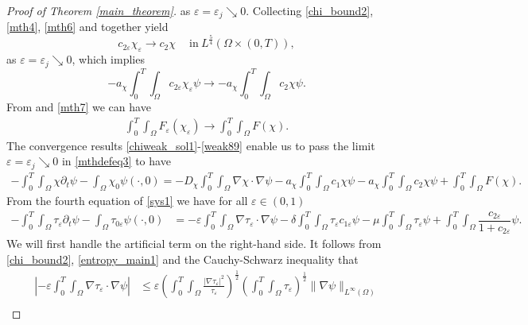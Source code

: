 \documentclass[a4paper,10pt]{article}
\theoremstyle{definition}
\begin{document}
\begin{proof}[Proof of Theorem \ref{main_theorem}]
as $\varepsilon = \varepsilon_j \searrow 0$. Collecting \eqref{chi_bound2}, \eqref{mth4}, \eqref{mth6} and \cite[Lemma 3.9]{tao2021global} together yield
\begin{equation*}
  c_{2\varepsilon}\chi_\varepsilon  \to c_{2}\chi \quad ~\text{in}~ L^{\frac{5}{4}}(\Omega \times (0, T)),
\end{equation*}
as $\varepsilon = \varepsilon_j \searrow 0$, which implies
\begin{equation}
\label{chi_weak2}
  - a_\chi \int_0^T \int_\Omega c_{2\varepsilon}\chi_\varepsilon \psi \to - a_\chi \int_0^T \int_\Omega c_{2}\chi \psi.
\end{equation}
From \cite[Theorem 7, Appendix C: Calculus, particularly C5]{evans2022partial} and \eqref{mth7} we can have
\begin{align}
    \label{weak89}
     \int_0^T \int_\Omega F_\varepsilon(\chi_\varepsilon) \to \int_0^T \int_\Omega F(\chi).
\end{align}
The convergence results \eqref{chiweak_sol1}-\eqref{weak89} enable us to pass the limit $\varepsilon = \varepsilon_j \searrow 0$ in \eqref{mthdefeq3} to have
\begin{align}
   \label{chi_convgmthdefeq3}
  - \int_0^T \int_\Omega \chi \partial_t \psi - \int_\Omega \chi_{0} \psi(\cdot, 0) = - D_\chi \int_0^T \int_\Omega \nabla \chi \cdot \nabla \psi - a_\chi \int_0^T \int_\Omega c_{1}\chi \psi - a_\chi \int_0^T \int_\Omega c_{2}\chi \psi + \int_0^T \int_\Omega F(\chi).
\end{align}
From the fourth equation of \eqref{sys1} we have for all $\varepsilon \in (0, 1)$
\begin{align}
   \label{taumthdefeq3}
  - \int_0^T \int_\Omega \tau_{\varepsilon} \partial_t \psi - \int_\Omega \tau_{0\varepsilon} \psi(\cdot, 0) & = - \varepsilon \int_0^T \int_\Omega \nabla \tau_{\varepsilon} \cdot \nabla \psi
  - \delta \int_0^T \int_\Omega  \tau_\varepsilon c_{1\varepsilon} \psi - \mu \int_0^T \int_\Omega  \tau_\varepsilon \psi  +  \int_0^T \int_\Omega \dfrac{c_{2\varepsilon}}{1 + c_{2\varepsilon}} \psi.
\end{align}
We will first handle the artificial term on the right-hand side. It follows from \eqref{chi_bound2}, \eqref{entropy_main1} and the Cauchy-Schwarz inequality that
\begin{align}
\label{artificial1}
  \nonumber \left| - \varepsilon \int_0^T \int_\Omega \nabla \tau_\varepsilon \cdot \nabla \psi \right| & \leq  \varepsilon \left(\int_0^T \int_\Omega \frac{|\nabla \tau_\varepsilon|^2}{\tau_\varepsilon}\right)^{\frac{1}{2}}\left(\int_0^T \int_\Omega \tau_\varepsilon\right)^{\frac{1}{2}}\|\nabla \psi\|_{L^\infty(\Omega)} \\[5pt]

\end{align}
\end{proof}
\end{document}
